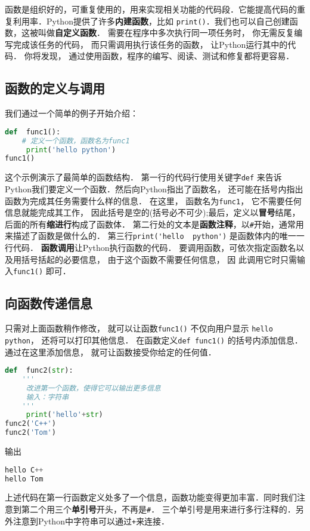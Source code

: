 

函数是组织好的，可重复使用的，用来实现相关功能的代码段．它能提高代码的重复利用率．Python提供了许多\textbf{内建函数}，比如 \verb|print()|．我们也可以自己创建函数，这被叫做\textbf{自定义函数}． 需要在程序中多次执行同一项任务时， 你无需反复编写完成该任务的代码， 而只需调用执行该任务的函数， 让Python运行其中的代码． 你将发现， 通过使用函数，程序的编写、阅读、测试和修复都将更容易．

\subsection{函数的定义与调用}
我们通过一个简单的例子开始介绍：
\begin{lstlisting}[language=python]
def  func1():
    # 定义一个函数，函数名为func1
     print('hello python')
func1()
\end{lstlisting}
这个示例演示了最简单的函数结构． 第一行的代码行使用关键字\verb|def| 来告诉Python我们要定义一个函数．然后向Python指出了函数名， 还可能在括号内指出函数为完成其任务需要什么样的信息． 在这里， 函数名为\verb|func1|， 它不需要任何信息就能完成其工作， 因此括号是空的(括号必不可少);最后，定义以\textbf{冒号}结尾， 后面的所有\textbf{缩进行}构成了函数体． 第二行处的文本是\textbf{函数注释}，以\verb|#|开始，通常用来描述了函数是做什么的．
第三行\verb|print('hello  python')| 是函数体内的唯一一行代码．
\textbf{函数调用}让Python执行函数的代码． 要调用函数，可依次指定函数名以及用括号括起的必要信息， 由于这个函数不需要任何信息， 因
此调用它时只需输入\verb|func1()| 即可．

\subsection{向函数传递信息}
只需对上面函数稍作修改， 就可以让函数\verb|func1()| 不仅向用户显示 \verb|hello python|， 还将可以打印其他信息． 在函数定义\verb|def func1()| 的括号内添加信息． 通过在这里添加信息， 就可让函数接受你给定的任何值．
\begin{lstlisting}[language=python]
def  func2(str):
    '''
     改进第一个函数，使得它可以输出更多信息
     输入：字符串
    '''
     print('hello'+str)
func2('C++')
func2('Tom')
\end{lstlisting}
输出
\begin{lstlisting}[language=python]
hello C++
hello Tom
\end{lstlisting}
上述代码在第一行函数定义处多了一个信息，函数功能变得更加丰富．同时我们注意到第二个用三个\textbf{单引号}开头，不再是\verb|#|． 三个单引号是用来进行多行注释的．另外注意到Python中字符串可以通过\verb|+|来连接．

